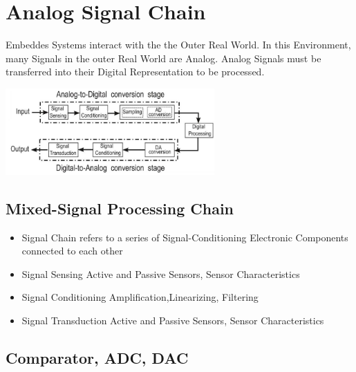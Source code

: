 \section{Analog Signal Chain}
\begin{minipage}{11cm}
	Embeddes Systems interact with the the Outer Real World. In this Environment, many Signals in the outer Real World are Analog. Analog Signals must be transferred into their Digital Representation to be processed. 
\end{minipage}
\begin{minipage}{6cm}
	\includegraphics[width=8cm]{images/signalchain.jpg}
\end{minipage}
\subsection{Mixed-Signal Processing Chain }
\begin{itemize}
	\item Signal Chain
	\subitem refers to a series of Signal-Conditioning Electronic Components connected to each other
	\item Signal Sensing
	\subitem Active and Passive Sensors, Sensor Characteristics
	\item Signal Conditioning
	\subitem Amplification,Linearizing, Filtering
	\item Signal Transduction
	\subitem Active and Passive Sensors, Sensor Characteristics
\end{itemize}
\subsection{Comparator, ADC, DAC }
